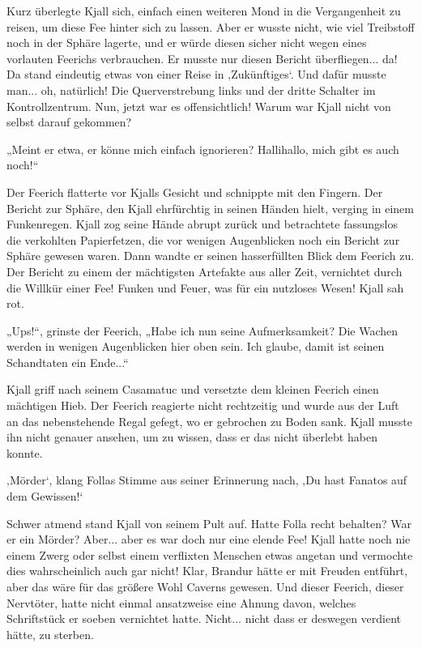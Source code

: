 \documentclass[10pt, a4paper, oneside]{book}
\begin{document}
Kurz überlegte Kjall sich, einfach einen weiteren Mond in die Vergangenheit zu reisen, um diese Fee hinter sich zu lassen. Aber er wusste nicht, wie viel Treibstoff noch in der Sphäre lagerte, und er würde diesen sicher nicht wegen eines vorlauten Feerichs verbrauchen. Er musste nur diesen Bericht überfliegen... da! Da stand eindeutig etwas von einer Reise in ‚Zukünftiges‘. Und dafür musste man... oh, natürlich! Die Querverstrebung links und der dritte Schalter im Kontrollzentrum. Nun, jetzt war es offensichtlich! Warum war Kjall nicht von selbst darauf gekommen?

„Meint er etwa, er könne mich einfach ignorieren? Hallihallo, mich gibt es auch noch!“

Der Feerich flatterte vor Kjalls Gesicht und schnippte mit den Fingern. Der Bericht zur Sphäre, den Kjall ehrfürchtig in seinen Händen hielt, verging in einem Funkenregen. Kjall zog seine Hände abrupt zurück und betrachtete fassungslos die verkohlten Papierfetzen, die vor wenigen Augenblicken noch ein Bericht zur Sphäre gewesen waren. Dann wandte er seinen hasserfüllten Blick dem Feerich zu. Der Bericht zu einem der mächtigsten Artefakte aus aller Zeit, vernichtet durch die Willkür einer Fee! Funken und Feuer, was für ein nutzloses Wesen! Kjall sah rot.

„Ups!“, grinste der Feerich, „Habe ich nun seine Aufmerksamkeit? Die Wachen werden in wenigen Augenblicken hier oben sein. Ich glaube, damit ist seinen Schandtaten ein Ende...“

Kjall griff nach seinem Casamatuc und versetzte dem kleinen Feerich einen mächtigen Hieb. Der Feerich reagierte nicht rechtzeitig und wurde aus der Luft an das nebenstehende Regal gefegt, wo er gebrochen zu Boden sank. Kjall musste ihn nicht genauer ansehen, um zu wissen, dass er das nicht überlebt haben konnte.

‚Mörder‘, klang Follas Stimme aus seiner Erinnerung nach, ‚Du hast Fanatos auf dem Gewissen!‘

Schwer atmend stand Kjall von seinem Pult auf. Hatte Folla recht behalten? War er ein Mörder? Aber... aber es war doch nur eine elende Fee! Kjall hatte noch nie einem Zwerg oder selbst einem verflixten Menschen etwas angetan und vermochte dies wahrscheinlich auch gar nicht! Klar, Brandur hätte er mit Freuden entführt, aber das wäre für das größere Wohl Caverns gewesen. Und dieser Feerich, dieser Nervtöter, hatte nicht einmal ansatzweise eine Ahnung davon, welches Schriftstück er soeben vernichtet hatte. Nicht... nicht dass er deswegen verdient hätte, zu sterben.
\end{document}
